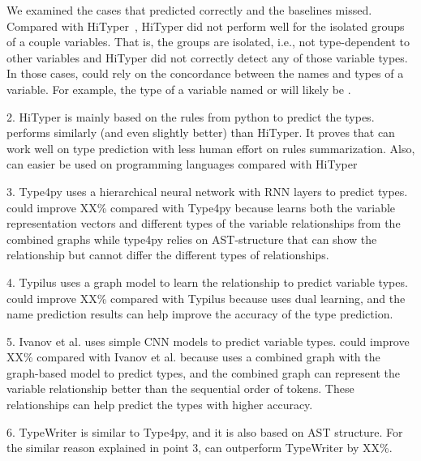 We examined the cases that {\tool} predicted correctly and the
baselines missed. Compared with HiTyper~\cite{HiTyper-icse22}, HiTyper
did not perform well for the isolated groups of a couple
variables. That is, the groups are isolated, i.e., not type-dependent
to other variables and HiTyper did not correctly detect any of those
variable types. In those cases, {\tool} could rely on the concordance
between the names and types of a variable. For example, the type of a
variable named  or  will likely be .


2. HiTyper is mainly based on the rules from python to predict the
types. {\tool} performs similarly (and even slightly better) than
HiTyper. It proves that {\tool} can work well on type prediction with
less human effort on rules summarization. Also, {\tool} can easier be
used on programming languages compared with HiTyper

3. Type4py uses a hierarchical neural network with RNN layers to predict types. {\tool} could improve XX\% compared with Type4py because {\tool} learns both the variable representation vectors and different types of the variable relationships from the combined graphs while type4py relies on AST-structure that can show the relationship but cannot differ the different types of relationships.

4. Typilus uses a graph model to learn the relationship to predict variable types. {\tool} could improve XX\% compared with Typilus because {\tool} uses dual learning, and the name prediction results can help improve the accuracy of the type prediction.

5. Ivanov et al.\cite{ivanov21predicting} uses simple CNN models to predict variable types. {\tool} could improve XX\% compared with Ivanov et al.\cite{ivanov21predicting} because {\tool} uses a combined graph with the graph-based model to predict types, and the combined graph can represent the variable relationship better than the sequential order of tokens. These relationships can help predict the types with higher accuracy.

6. TypeWriter is similar to Type4py, and it is also based on AST structure. For the similar reason explained in point 3, {\tool} can outperform TypeWriter by XX\%.
